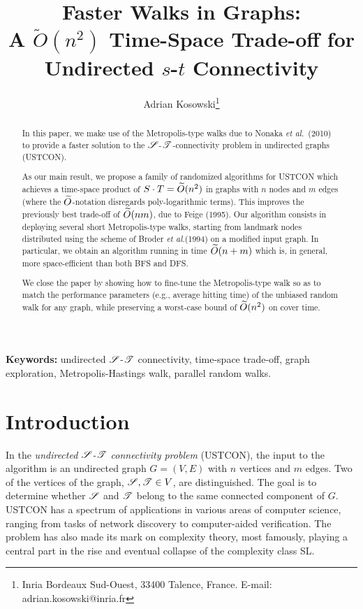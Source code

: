 \documentclass[11pt,a4paper]{article}
\author{Adrian Kosowski\footnote{Inria Bordeaux Sud-Ouest, 33400 Talence, France. E-mail: adrian.kosowski@inria.fr}}
\title{Faster Walks in Graphs:\\ A $\widetilde O(n^2)$ Time-Space Trade-off for Undirected $s$-$t$ Connectivity}
\date{}
\newcommand{\etal}{\textsl{et al.}\xspace}
\renewcommand{\O}{\ensuremath \widetilde O}
\newcommand{\s}{\ensuremath  \mathscr S}
\renewcommand{\t}{\ensuremath \mathscr  T}
\renewcommand{\*}{\hspace*{5mm}}
\begin{document}
\maketitle\thispagestyle{empty}
\setcounter{page}{0}
\vspace{8mm}

\begin{abstract}
\noindent
In this paper, we make use of the Metropolis-type walks due to Nonaka \etal\ (2010) to provide a faster solution to the $\s$-$\t$-connectivity problem in undirected graphs (USTCON).

As our main result, we propose a family of randomized algorithms for USTCON which achieves a time-space product of $S\cdot T = \O(n^2)$ in graphs with $n$ nodes and $m$ edges (where the $\O$-notation disregards poly-logarithmic terms). This improves the previously best trade-off of $\O(n m)$, due to Feige (1995). Our algorithm consists in deploying several short Metropolis-type walks, starting from landmark nodes distributed using the scheme of Broder \etal (1994) on a modified input graph. In particular, we obtain an algorithm running in time $\O(n+m)$ which is, in general, more space-efficient than both BFS and DFS. 

We close the paper by showing how to fine-tune the Metropolis-type walk so as to match the performance parameters (e.g., average hitting time) of the unbiased random walk for any graph, while preserving a worst-case bound of $\O(n^2)$ on cover time.
\end{abstract}
\vspace{8mm}
\textbf{Keywords:} undirected $\s$-$\t$ connectivity, time-space trade-off, graph exploration, Metropolis-Hastings walk, parallel random walks.
\newpage

\section{Introduction}

In the \emph{undirected $\s$-$\t$ connectivity problem} (USTCON), the input to the algorithm is an undirected graph $G=(V,E)$ with $n$ vertices and $m$ edges. Two of the vertices of the graph, $\s, \t \in V$, are distinguished. The goal is to determine whether $\s$ and $\t$ belong to the same connected component of $G$. USTCON has a spectrum of applications in various areas of computer science, ranging from tasks of network discovery to computer-aided verification. The problem has also made its mark on complexity theory, most famously, playing a central part in the rise and eventual collapse of the complexity class SL.
\end{document}
